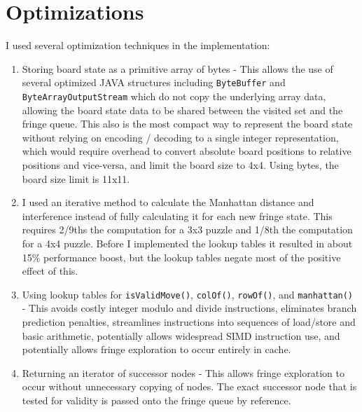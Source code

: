 \documentclass{article}
\begin{document}
	\section{Optimizations}
	    I used several optimization techniques in the implementation:
	    \begin{enumerate}
	    	\item Storing board state as a primitive array of bytes - This allows the use of several optimized JAVA structures including \texttt{ByteBuffer} and \texttt{ByteArrayOutputStream} which do not copy the underlying array data, allowing the board state data to be shared between the visited set and the fringe queue.  This also is the most compact way to represent the board state without relying on encoding / decoding to a single integer representation, which would require overhead to convert absolute board positions to relative positions and vice-versa, and limit the board size to 4x4.  Using bytes, the board size limit is 11x11.
	    	\item I used an iterative method to calculate the Manhattan distance and interference instead of fully calculating it for each new fringe state.  This requires 2/9ths the computation for a 3x3 puzzle and 1/8th the computation for a 4x4 puzzle.  Before I implemented the lookup tables it resulted in about 15\% performance boost, but the lookup tables negate most of the positive effect of this.
	    	\item Using lookup tables for \texttt{isValidMove()}, \texttt{colOf()}, \texttt{rowOf()}, and \texttt{manhattan()} - This avoids costly integer modulo and divide instructions, eliminates branch prediction penalties, streamlines instructions into sequences of load/store and basic arithmetic, potentially allows widespread SIMD instruction use, and potentially allows fringe exploration to occur entirely in cache.
	    	\item Returning an iterator of successor nodes - This allows fringe exploration to occur without unnecessary copying of nodes.  The exact successor node that is tested for validity is passed onto the fringe queue by reference.        
	    \end{enumerate}
\end{document}
